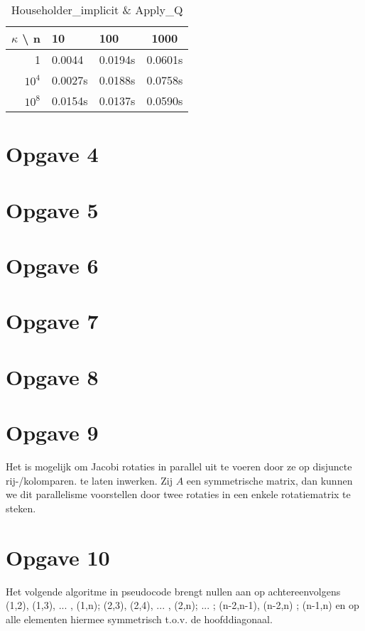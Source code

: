 \documentclass[a4paper]{article}
\newcommand{\opgave}[1]{\section*{Opgave #1}}
\begin{document}
\begin{table}
\begin{center}
\begin{tabular}{r|llc}
$\kappa$ \textbackslash{} n & 10 & 100 & 1000 \\\hline
1 & 0.0044 & 0.0194s & 0.0601s \\
$10^4$ & 0.0027s & 0.0188s & 0.0758s \\
$10^8$ & 0.0154s & 0.0137s & 0.0590s
\end{tabular}
\end{center}
\caption{Householder\_implicit & Apply\_Q}
\label{tab1}
\end{table}

\opgave{4}

\opgave{5}

\opgave{6}

\opgave{7}

\opgave{8}


\opgave{9}
Het is mogelijk om Jacobi rotaties in parallel uit te voeren door ze op disjuncte rij-/kolomparen.
te laten inwerken. Zij $A$ een symmetrische matrix, dan kunnen we dit parallelisme voorstellen door twee rotaties in een enkele rotatiematrix te steken.

\pagebreak

\opgave{10}

Het volgende algoritme in pseudocode brengt nullen aan op achtereenvolgens (1,2), (1,3), ... , (1,n); (2,3), (2,4), ... , (2,n); ... ; (n-2,n-1), (n-2,n) ; (n-1,n) en op alle elementen hiermee symmetrisch t.o.v. de hoofddiagonaal.\\
\end{document}
